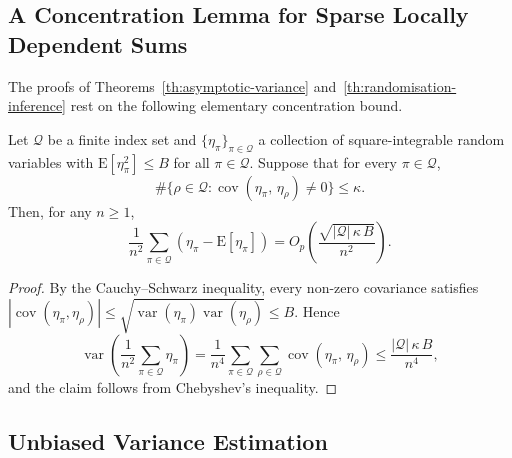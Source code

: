 \documentclass[sigconf]{acmart}
\newcommand{\E}{\mathrm E}
\DeclareMathOperator{\var}{var}
\DeclareMathOperator{\cov}{cov}
\begin{document}
\subsection{A Concentration Lemma for Sparse Locally Dependent Sums}

The proofs of Theorems~\ref{th:asymptotic-variance} and~\ref{th:randomisation-inference} rest on the following elementary concentration bound.

\begin{lemma}\label{lem:sparse}
    Let $\mathcal Q$ be a finite index set and $\{\eta_\pi\}_{\pi\in\mathcal Q}$ a collection of square-integrable random variables with $\E[\eta_\pi^2]\le B$ for all $\pi\in\mathcal Q$. Suppose that for every $\pi\in\mathcal Q$,
    \begin{equation*}
        \#\{\rho\in\mathcal Q\colon \cov(\eta_\pi,\,\eta_\rho)\neq 0\} \le \kappa.
    \end{equation*}
    Then, for any $n\ge 1$,
    \begin{equation*}
        \frac 1{n^2}\sum_{\pi\in\mathcal Q}(\eta_\pi - \E[\eta_\pi]) = O_p\left(\frac{\sqrt{|\mathcal Q|\,\kappa\, B}}{n^2}\right).
    \end{equation*}
\end{lemma}
\begin{proof}
    By the Cauchy--Schwarz inequality, every non-zero covariance satisfies $|{\cov(\eta_\pi,\eta_\rho)}|\le \sqrt{\var(\eta_\pi)\var(\eta_\rho)}\le B$. Hence
    \begin{equation*}
        \var\left(\frac 1{n^2}\sum_{\pi\in\mathcal Q}\eta_\pi\right) = \frac 1{n^4}\sum_{\pi\in\mathcal Q}\sum_{\rho\in\mathcal Q}\cov(\eta_\pi,\,\eta_\rho) \le \frac{|\mathcal Q|\,\kappa\,B}{n^4},
    \end{equation*}
    and the claim follows from Chebyshev's inequality.
\end{proof}

\subsection{Unbiased Variance Estimation}\label{app:variance}
\end{document}
